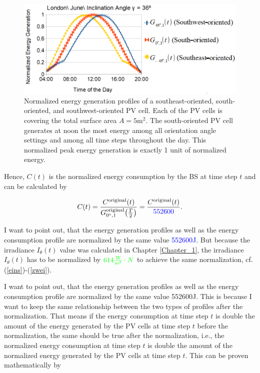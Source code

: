 \begin{figure}[H]
	\centering
		\includegraphics[width=1\columnwidth]{pictures/orien}
\caption{Normalized energy generation profiles of a southeast-oriented, south-oriented, and southwest-oriented PV cell. Each of the PV cells is covering the total surface area $A=5\mathrm{m^2}$. The south-oriented PV cell generates at noon the most energy among all orientation angle settings and among all time steps throughout the day. This normalized peak energy generation is exactly 1 unit of normalized energy.\label{norm}}
\end{figure}

Hence, $C(t)$ is the normalized energy consumption by the BS at time step $t$ and can be calculated by

\begin{equation}\label{zwei}
C(t)=\frac{C^{\text{original}}(t)}{G^{\text{original}}_{0^{\mathrm{o}},1}\big(\frac{T}{2}\big)}=\frac{C^{\text{original}}(t)}{\textcolor{blue}{552600}}.
\end{equation}

I want to point out, that the energy generation profiles as well as the energy consumption profile are normalized by the same value \textcolor{blue}{552600J}. But because the irradiance $I_{\theta}(t)$ value was calculated in Chapter \ref{Chapter_1}, the irradiance $I_{\theta}(t)$ has to be normalized by $\textcolor{green}{614\frac{\mathrm{W}}{\mathrm{m^2}}\cdot N}$ to achieve the same normalization, cf. (\ref{eins})-(\ref{zwei}). 


I want to point out, that the energy generation profiles as well as the energy consumption profile are normalized by the same value 552600J. This is because I want to keep the same relationship between the two types of profiles after the normalization. That means if the energy consumption at time step $t$ is double the amount of the energy generated by the PV cells at time step $t$ before the normalization, the same should be true after the normalization, i.e., the normalized energy consumption at time step $t$ is double the amount of the normalized energy generated by the PV cells at time step $t$. This can be proven mathematically by

